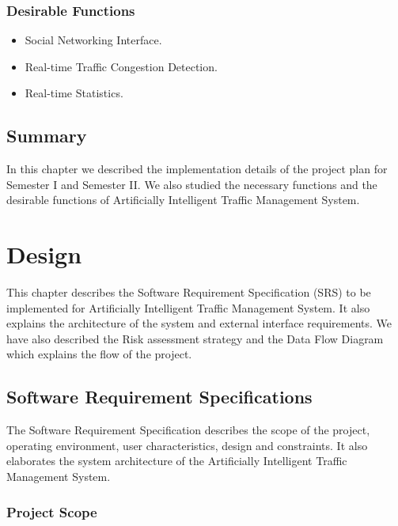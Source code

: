 \documentclass[openany,12pt]{report}
\begin{document}
\subsection{Desirable  Functions}
\begin{itemize}
\item{Social Networking Interface.}
\item{Real-time Traffic Congestion Detection.}
\item{Real-time Statistics.}

\end{itemize}

\section{Summary}
\hspace*{0.5in}In this chapter we described the implementation details of the project plan for Semester I and Semester II. We also studied the necessary functions and the desirable functions of Artificially Intelligent Traffic Management System.
\chapter{Design}
\hspace*{0.5in}This chapter describes the Software Requirement Specification (SRS) to be implemented for Artificially Intelligent Traffic Management System. It also explains the architecture of the system and external interface requirements. We have also described the Risk assessment strategy and the Data Flow Diagram which explains the flow of the project.
\section{Software Requirement Specifications}
\hspace*{0.5in} The Software Requirement Specification describes the scope of the project, operating environment, user characteristics, design and constraints. It also elaborates the system architecture of the Artificially Intelligent Traffic Management System.

\subsection{Project Scope}
\end{document}
